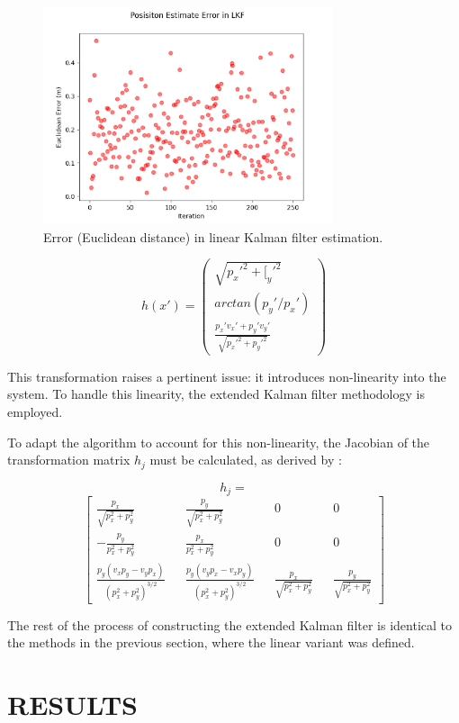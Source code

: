 \documentclass{article}
\begin{document}
\begin{figure}[hb]
\begin{minipage}[b]{1.0\linewidth}
  \centering
  \centerline{\includegraphics[width=8.5cm]{2.png}}
\end{minipage}
\caption{Error (Euclidean distance) in linear Kalman filter estimation.}
\end{figure}

$$
h(x')=\begin{pmatrix}
\sqrt{p_x'^2+[_y'^2}\\
arctan(p_y'/p_x')\\
\frac{p_x'v_x'+p_y'v_y'}{\sqrt{p_x'^2+p_y'^2}}
\end{pmatrix}
$$

This transformation raises a pertinent issue: it introduces non-linearity into the system. To handle this linearity, the extended Kalman filter methodology is employed.



To adapt the algorithm to account for this non-linearity, the Jacobian of the transformation matrix $h_j$ must be calculated, as derived by \cite{gaskey19}:

$$
h_j=
$$$$\begin{bmatrix}
\frac{p_x}{\sqrt{p_x^2+p_y^2}} && \frac{p_y}{\sqrt{p_x^2+p_y^2}} && 0 && 0\\
-\frac{p_y}{p_x^2+p_y^2} && \frac{p_x}{p_x^2+p_y^2} && 0 && 0\\
\frac{p_y(v_xp_y-v_yp_x)}{(p_x^2+p_y^2)^{3/2}}&& \frac{p_y(v_yp_x-v_xp_y)}{(p_x^2+p_y^2)^{3/2}} && \frac{p_x}{\sqrt{p_x^2+p_y^2}} && \frac{p_y}{\sqrt{p_x^2+p_y^2}}
\end{bmatrix}$$

The rest of the process of constructing the extended Kalman filter is identical to the methods in the previous section, where the linear variant was defined.

\section{RESULTS}
\label{sec:results}
\end{document}
